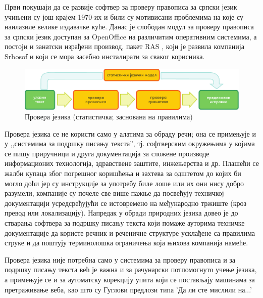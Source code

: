 {\begin{multicols}{2}

Први покушаји да се развије софтвер за проверу правописа за српски језик учињени су још крајем 1970-их \cite{UROSEVIC}  и били су мотивисани проблемима на које су наилазиле велике издавачке куће. Данас је слободан модул за проверу правописа за српски језик доступан за OpenOffice \cite{OpenOffice} на различитим оперативним системима, а постоји и занатски израђени производ, пакет RAS \cite{RASPROG}, који је развила компанија Srbosof и који се мора засебно инсталирати за сваког корисника. 

\begin{figure}[htb]
  \center
  \includegraphics[width=\textwidth]{../_media/serbian/language_checking}
  \caption{Провера језика (статистичка; заснована на правилима)}
  \label{fig:langcheckingaarch_sr}
\end{figure}

Провера језика се не користи само у алатима за обраду речи; она се примењује и у ,,системима за подршку писању текста'', тј. софтверским окружењима у којима се пишу приручници и друга документација за сложене производе информационих технологија, здравствене заштите, инжењерства и др. Плашећи се жалби купаца због погрешног коришћења и захтева за одштетом до којих би могло доћи јер су инструкције за употребу биле лоше или их они нису добро разумели, компаније су почеле све више пажње да посвећују техничкој документацији усредсређујући се истовремено на међународно тржиште (кроз превод или локализацију). Напредак у обради природних језика довео је до стварања софтвера за подршку писању текста који помаже ауторима техничке документације да користе речник и реченичне структуре усклађене са правилима струке и да поштују терминолошка ограничења која њихова компанија намеће. 

Провера језика није потребна само у системима за проверу правописа и за подршку писању текста већ је важна и за рачунарски потпомогнуто учење језика, а примењује се и  за аутоматску корекцију упита који се постављају машинама за претраживање веба, као што су Гуглови предлози типа 'Да ли сте мислили на...' 
 

\end{multicols}}
